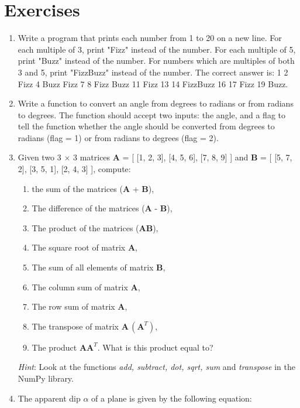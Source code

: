 \documentclass[a4paper , 12pt]{book}
\begin{document}
\section{Exercises}

\begin{enumerate}
    \item Write a program that prints each number from 1 to 20 on a new line. For each multiple of 3, print "Fizz" instead of the number. For each multiple of 5, print "Buzz" instead of the number. For numbers which are multiples of both 3 and 5, print "FizzBuzz" instead of the number. The correct answer is: 1 2 Fizz 4 Buzz Fizz 7 8 Fizz Buzz 11 Fizz 13 14 FizzBuzz 16 17 Fizz 19 Buzz.
    
    \item Write a function to convert an angle from degrees to radians or from radians to degrees. The function should accept two inputs: the angle, and a flag to tell the function whether the angle should be converted from degrees to radians (flag = 1) or from radians to degrees (flag = 2).
    
    \item Given two 3 $\times$ 3 matrices \textbf{A} = [ [1, 2, 3], [4, 5, 6], [7, 8, 9] ] and \textbf{B} = [ [5, 7, 2], [3, 5, 1], [2, 4, 3] ], compute: 
    \begin{enumerate}
    \item  the sum of the matrices (\textbf{A} + \textbf{B}), 
    \item  The difference of the matrices (\textbf{A} - \textbf{B}), 
    \item  The product of the matrices (\textbf{AB}), 
    \item  The square root of matrix \textbf{A}, 
    \item  The sum of all elements of matrix \textbf{B}, 
    \item  The column sum of matrix \textbf{A}, 
    \item  The row sum of matrix \textbf{A}, 
    \item  The transpose of matrix $\textbf{A}\, (\textbf{A}^T)$, 
    \item  The product $\textbf{AA}^T$. What is this product equal to?
    \end{enumerate} 
    
    \textit{Hint}: Look at the functions \textit{add, subtract, dot, sqrt, sum} and \textit{transpose} in the NumPy library. 
    
    \item The apparent dip $\alpha$ of a plane is given by the following equation:
    

\end{enumerate}
\end{document}
